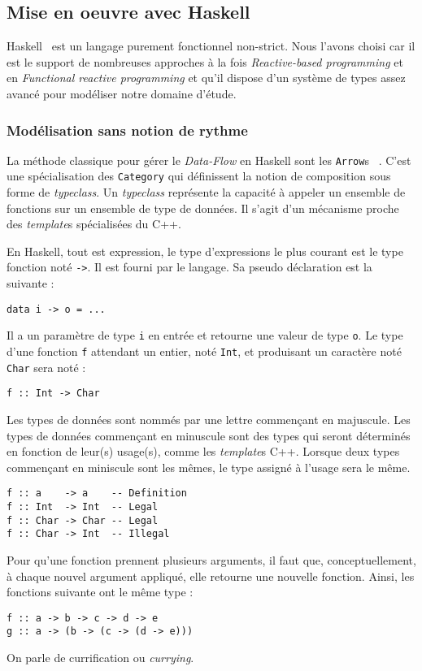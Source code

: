 \documentclass{llncs}
\newcommand{\DF}{\emph{Data-Flow} }
\newcommand{\RP}{\emph{Reactive-based programming} }
\newcommand{\FRP}{\emph{Functional reactive programming} }
\newcommand{\Arrs}{\lstinline{Arrow}s }
\begin{document}
\subsection{Mise en oeuvre avec Haskell}
Haskell~\cite{Haskell10} est un langage purement fonctionnel non-strict.
Nous l'avons choisi car il est le support de nombreuses approches à la fois \RP
et en \FRP et qu'il dispose d'un système de types assez avancé pour modéliser
notre domaine d'étude.

\subsubsection{Modélisation sans notion de rythme}
La méthode classique pour gérer le \DF en Haskell sont les \Arrs~\cite{Hughes00}.
C'est une spécialisation des \lstinline{Category}
qui définissent la notion de composition sous forme de \emph{typeclass}.
Un \emph{typeclass} représente la capacité à appeler un ensemble
de fonctions sur un ensemble de type de données.
Il s'agit d'un mécanisme proche des \emph{template}s spécialisées du C++.

En Haskell, tout est expression, le type d'expressions le plus courant est le type
fonction noté \lstinline{->}.
Il est fourni par le langage.
Sa pseudo déclaration est la suivante :
\begin{lstlisting}
data i -> o = ...
\end{lstlisting}
Il a un paramètre de type \lstinline{i} en entrée et retourne une
valeur de type \lstinline{o}.
Le type d'une fonction \lstinline{f} attendant un entier, noté \lstinline{Int}, et
produisant un caractère noté \lstinline{Char} sera noté :
\begin{lstlisting}
f :: Int -> Char
\end{lstlisting}

Les types de données sont nommés par une lettre commençant en majuscule.
Les types de données commençant en minuscule sont des types qui seront déterminés
en fonction de leur(s) usage(s), comme les \emph{template}s C++.
Lorsque deux types commençant en miniscule sont les mêmes, le type assigné à
l'usage sera le même.
\begin{lstlisting}
f :: a    -> a    -- Definition
f :: Int  -> Int  -- Legal
f :: Char -> Char -- Legal
f :: Char -> Int  -- Illegal
\end{lstlisting}

Pour qu'une fonction prennent plusieurs arguments, il faut que, conceptuellement,
à chaque nouvel argument appliqué, elle retourne une nouvelle fonction.
Ainsi, les fonctions suivante ont le même type :
\begin{lstlisting}
f :: a -> b -> c -> d -> e
g :: a -> (b -> (c -> (d -> e)))
\end{lstlisting}
On parle de currification ou \emph{currying}.
\end{document}
